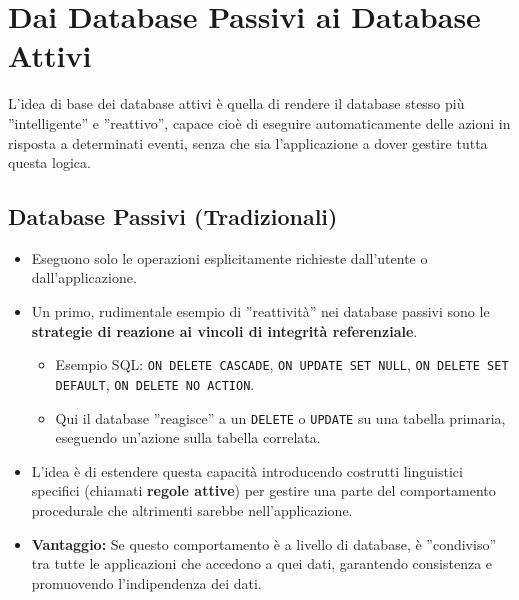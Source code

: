 \section{Dai Database Passivi ai Database Attivi}
L'idea di base dei database attivi è quella di rendere il database stesso più ''intelligente'' e ''reattivo'', capace cioè di eseguire automaticamente delle azioni in risposta a determinati eventi, senza che sia l'applicazione a dover gestire tutta questa logica.

\subsection{Database Passivi (Tradizionali)}
\begin{itemize}
	\item Eseguono solo le operazioni esplicitamente richieste dall'utente o dall'applicazione.
	\item Un primo, rudimentale esempio di ''reattività'' nei database passivi sono le \textbf{strategie di reazione ai vincoli di integrità referenziale}.
	\begin{itemize}
		\item Esempio SQL: \texttt{ON DELETE CASCADE}, \texttt{ON UPDATE SET NULL}, \texttt{ON DELETE SET DEFAULT}, \texttt{ON DELETE NO ACTION}.
		\item Qui il database ''reagisce'' a un \texttt{DELETE} o \texttt{UPDATE} su una tabella primaria, eseguendo un'azione sulla tabella correlata.
	\end{itemize}
	\item L'idea è di estendere questa capacità introducendo costrutti linguistici specifici (chiamati \textbf{regole attive}) per gestire una parte del comportamento procedurale che altrimenti sarebbe nell'applicazione.
	\item \textbf{Vantaggio:} Se questo comportamento è a livello di database, è ''condiviso'' tra tutte le applicazioni che accedono a quei dati, garantendo consistenza e promuovendo l'indipendenza dei dati.
\end{itemize}

